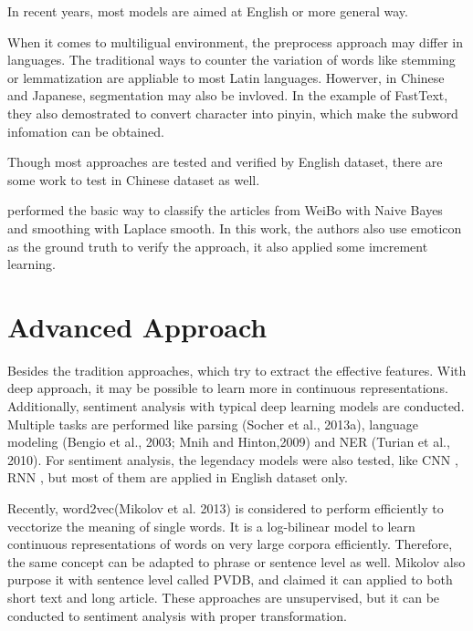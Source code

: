 In recent years, most models are aimed at English or more general way. 

When it comes to multiligual environment, the preprocess approach may differ in languages. The traditional ways to counter the variation of words like stemming or lemmatization are appliable to most Latin languages.
Howerver, in Chinese and Japanese, segmentation may also be invloved. In the example of FastText\cite{joulin2016fasttext}, they also demostrated to convert character into pinyin, which make the subword infomation can be obtained. 

Though most approaches are tested and verified by English dataset, there are some work to test in Chinese dataset as well.

\cite{zhao2012moodlens} performed the basic way to classify the articles from WeiBo with Naive Bayes and smoothing with Laplace smooth.  
In this work, the authors also use emoticon as the ground truth to verify the approach, it also applied some imcrement learning. \\


\section{Advanced Approach}

Besides the tradition approaches, which try to extract the effective features. With deep approach, it may be possible to learn more in  continuous representations.
Additionally, sentiment analysis with typical deep learning models are conducted. Multiple tasks are performed like  parsing (Socher et al., 2013a), language
modeling (Bengio et al., 2003; Mnih and Hinton,2009) and NER (Turian et al., 2010). For sentiment analysis, the legendacy models were also tested, like CNN \cite{kim2014convolutional}, RNN \cite{arevian2007recurrent}, but most of them are applied in English dataset only. 

Recently, word2vec(Mikolov et al. 2013)\cite{word2vec} is considered to perform efficiently to vecctorize the meaning of single words. It is a log-bilinear model to learn continuous
representations of words on very large corpora efficiently. Therefore, the same concept can be adapted to phrase or sentence level as well.
Mikolov also purpose it with sentence level \cite{PVDB} called PVDB, and claimed it can applied to both short text and long article. These approaches are unsupervised, but it can be conducted to sentiment analysis with proper transformation. 

